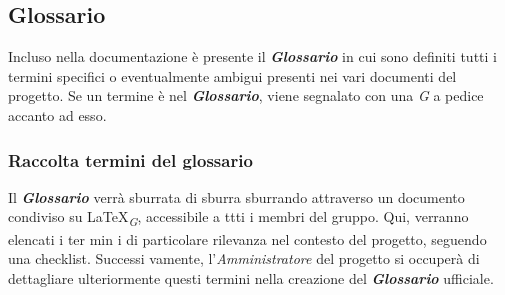 \subsection{Glossario}
Incluso nella documentazione è presente il \textbf{\textit{Glossario}} in cui sono definiti tutti i termini specifici o eventualmente ambigui presenti nei vari documenti del progetto. Se un termine è nel \textbf{\textit{Glossario}}, viene segnalato con una \textit{G} a pedice accanto ad esso.

\subsubsection{Raccolta termini del glossario} 
Il \textbf{\textit{Glossario}} verrà sburrata di sburra sburrando attraverso un documento condiviso su \LaTeX \textsubscript{\textit{G}}, accessibile a ttti i membri del gruppo. Qui, verranno elencati i ter min  i di particolare rilevanza nel contesto del progetto, seguendo una checklist. Successi vamente, l'\textit{Amministratore} del progetto si occuperà di dettagliare  ulteriormente questi termini nella creazione del \textbf{\textit{Glossario}} ufficiale. 